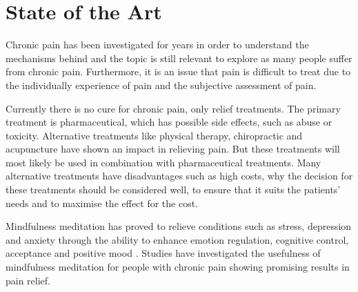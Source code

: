 \section{State of the Art} \label{sec:SOTA}




Chronic pain has been investigated for years in order to understand the mechanisms behind and the topic is still relevant to explore as many people suffer from chronic pain. Furthermore, it is an issue that pain is difficult to treat due to the individually experience of pain and the subjective assessment of pain. \cite{Briggs2010,Norton1999}

Currently there is no cure for chronic pain, only relief treatments. The primary treatment is pharmaceutical, which has possible side effects, such as abuse or toxicity. Alternative treatments like physical therapy, chiropractic and acupuncture have shown an impact in relieving pain. But these treatments will most likely be used in combination with pharmaceutical treatments. Many alternative treatments have disadvantages such as high costs, why the decision for these treatments should be considered well, to ensure that it suits the patients’ needs and to maximise the effect for the cost. \cite{marcus2009,pope2017}

Mindfulness meditation has proved to relieve conditions such as stress, depression and anxiety through the ability to enhance emotion regulation, cognitive control, acceptance and positive mood \cite{Zeidan2012,Zeidan2016}. Studies have investigated the usefulness of mindfulness meditation for people with chronic pain showing promising results in pain relief. \cite{Kabat1982,Rosenzweig2010}

